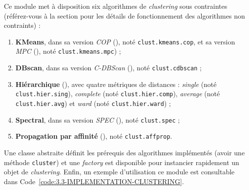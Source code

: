 		Ce module met à disposition six algorithmes de \textit{clustering} sous contraintes (référez-vous à la section  pour les détails de fonctionnement des algorithmes non contraints) :
		\begin{enumerate}
			\item \textbf{KMeans}, dans sa version \textit{COP} (\cite{wagstaff-etal:2001:constrained-kmeans-clustering}), noté \texttt{clust.kmeans.cop}, et sa version \textit{MPC} (\cite{khan-etal:2012:multiple-parameter-based}), noté \texttt{clust.kmeans.mpc}) ;
			\item \textbf{DBscan}, dans sa version \textit{C-DBScan} (\cite{ruiz-etal:2010:densitybased-semisupervised-clustering}), noté \texttt{clust.cdbscan} ;
			\item \textbf{Hiérarchique} (\cite{davidson-ravi:2005:agglomerative-hierarchical-clustering}), avec quatre métriques de distances : \textit{single} (noté \texttt{clust.hier.sing}), \textit{complete} (noté \texttt{clust.hier.comp}), \textit{average} (noté \texttt{clust.hier.avg}) et \textit{ward} (noté \texttt{clust.hier.ward}) ;
			\item \textbf{Spectral}, dans sa version \textit{SPEC} (\cite{kamvar-etal:2003:spectral-learning}), noté \texttt{clust.spec} ;
			\item \textbf{Propagation par affinité} (\cite{givoni-frey:2009:semisupervised-affinity-propagation}), noté \texttt{clust.affprop}.
		\end{enumerate}
		
		Une classe abstraite définit les prérequis des algorithmes implémentés (avoir une méthode \texttt{cluster}) et une \textit{factory} est disponible pour instancier rapidement un objet de \textit{clustering}.
		Enfin, un exemple d'utilisation ce module est consultable dans Code~\ref{code:3.3-IMPLEMENTATION-CLUSTERING}.
		
